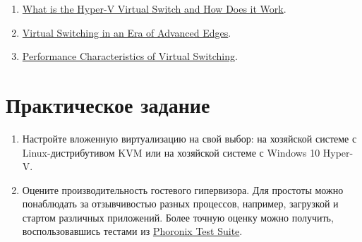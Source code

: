 \documentclass[14pt, a4paper]{article}
\begin{document}
\begin{enumerate}
    \item \href{https://www.altaro.com/hyper-v/the-hyper-v-virtual-switch-explained-part-1/}{What is the Hyper-V Virtual Switch and How Does it Work}.
    \item \href{http://www.itc22.com/fileadmin/ITC22_files/Edge_Talk-Pettit.pdf}{Virtual Switching in an Era of Advanced Edges}.
    \item \href{https://www.net.in.tum.de/fileadmin/bibtex/publications/papers/Open-vSwitch-CloudNet-14.pdf}{Performance Characteristics of Virtual Switching}.
\end{enumerate}

\section*{Практическое задание} 

\begin{enumerate}
    \item Настройте вложенную виртуализацию на свой выбор: на хозяйской системе с
    Linux-дистрибутивом KVM или на хозяйской системе с Windows 10 Hyper-V.
    \item Оцените производительность гостевого гипервизора. Для простоты можно понаблюдать за
    отзывчивостью разных процессов, например, загрузкой и стартом различных приложений.
    Более точную оценку можно получить, воспользовавшись тестами из \href{https://www.phoronix-test-suite.com/}{Phoronix Test Suite}.
\end{enumerate}
\end{document}
